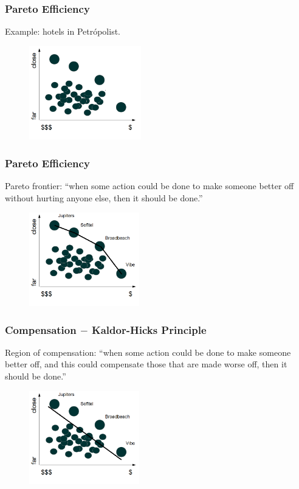 \documentclass[14pt]{beamer}
\begin{document}
\begin{frame}\frametitle{Pareto Efficiency}

Example: hotels in Petr\'{o}polist.

\begin{figure}
\centering
\includegraphics[height=1.60in]{hotel1}
\end{figure}

\end{frame}

\begin{frame}\frametitle{Pareto Efficiency}

Pareto frontier: ``when some action could be done to make someone better off without hurting anyone else, then it should be done.''

\begin{figure}
\centering
\includegraphics[height=1.60in]{hotel2}
\end{figure}

\end{frame}

\begin{frame}\frametitle{Compensation $-$ Kaldor-Hicks Principle}

Region of compensation: ``when some action could be done to make someone better off, and this could compensate those that are made worse off, then it should be done.''

\begin{figure}
\centering
\includegraphics[height=1.60in]{hotel3}
\end{figure}

\end{frame}
\end{document}
